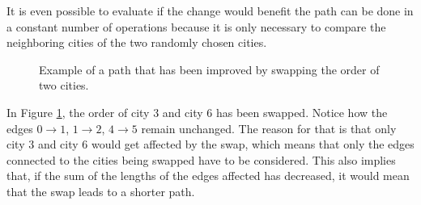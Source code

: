 \documentclass{article}
\begin{document}
\noindent
It is even possible to evaluate if the change would benefit the path can be done in a constant number of operations because it is only necessary to compare the neighboring cities of the two randomly chosen cities.
\begin{figure}[ht]
     \centering
     \caption{Example of a path that has been improved by swapping the order of two cities.}
     \label{Figure:Swapping}
\end{figure}

\noindent
In Figure \ref{Figure:Swapping}, the order of city $3$ and city $6$ has been swapped. Notice how the edges $0 \rightarrow 1$, $1 \rightarrow 2$, $4 \rightarrow 5$ remain unchanged. The reason for that is that only city $3$ and city $6$ would get affected by the swap, which means that only the edges connected to the cities being swapped have to be considered. This also implies that, if the sum of the lengths of the edges affected has decreased, it would mean that the swap leads to a shorter path.

 
\end{document}
